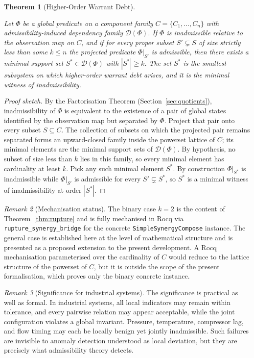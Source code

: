 \documentclass[12pt]{article}
\theoremstyle{plain}
\newtheorem{theorem}{Theorem}[section]
\theoremstyle{definition}
\theoremstyle{remark}
\newtheorem{remark}[theorem]{Remark}
\begin{document}
\begin{theorem}[Higher-Order Warrant Debt]
\label{thm:higher-order}

Let $\Phi$ be a global predicate on a component family
$C = \{C_1,\dots,C_n\}$ with admissibility-induced dependency family
$\mathcal{D}(\Phi)$.
If $\Phi$ is inadmissible relative to the observation map on $C$, and
if for every proper subset $S' \subsetneq S$ of size strictly less than
some $k \leq n$ the projected predicate $\Phi|_{S'}$ is admissible,
then there exists a minimal support set $S^* \in \mathcal{D}(\Phi)$
with $|S^*| \geq k$.
The set $S^*$ is the smallest subsystem on which higher-order warrant
debt arises, and it is the minimal witness of inadmissibility.

\end{theorem}

\begin{proof}[Proof sketch]
By the Factorisation Theorem (Section~\ref{sec:quotients}),
inadmissibility of $\Phi$ is equivalent to the existence of a pair of
global states identified by the observation map but separated by
$\Phi$.
Project that pair onto every subset $S \subseteq C$.
The collection of subsets on which the projected pair remains separated
forms an upward-closed family inside the powerset lattice of $C$;
its minimal elements are the minimal support sets of $\mathcal{D}(\Phi)$.
By hypothesis, no subset of size less than $k$ lies in this family, so
every minimal element has cardinality at least $k$.
Pick any such minimal element $S^*$.
By construction $\Phi|_{S^*}$ is inadmissible while $\Phi|_{S'}$ is
admissible for every $S' \subsetneq S^*$, so $S^*$ is a minimal
witness of inadmissibility at order $|S^*|$.
\end{proof}

\begin{remark}[Mechanisation status]
The binary case $k = 2$ is the content of Theorem~\ref{thm:rupture}
and is fully mechanised in Rocq via
\texttt{rupture\_synergy\_bridge} for the concrete
\texttt{SimpleSynergyCompose} instance.
The general case is established here at the level of mathematical
structure and is presented as a proposed extension to the present
development. A Rocq mechanisation parameterised over the cardinality
of $C$ would reduce to the lattice structure of the powerset of $C$,
but it is outside the scope of the present formalisation, which
proves only the binary concrete instance.
\end{remark}

\begin{remark}[Significance for industrial systems]
The significance is practical as well as formal.
In industrial systems, all local indicators may remain within
tolerance, and every pairwise relation may appear acceptable, while
the joint configuration violates a global invariant.
Pressure, temperature, compressor lag, and flow timing may each be
locally benign yet jointly inadmissible.
Such failures are invisible to anomaly detection understood as local
deviation, but they are precisely what admissibility theory detects.
\end{remark}
\end{document}
